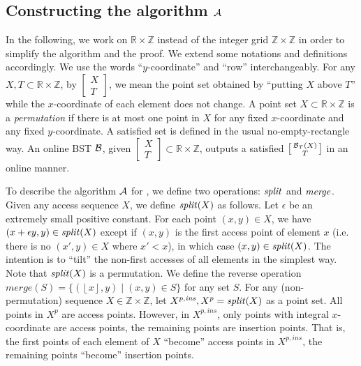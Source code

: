 \subsection{Constructing the algorithm $\cA$}



In the following, we work on $\mathbb{R}\times\mathbb{Z}$ instead
of the integer grid $\mathbb{Z}\times\mathbb{Z}$ in order to simplify
the algorithm and the proof. We extend some notations and definitions
accordingly. We use the words ``$y$-coordinate'' and  ``row'' interchangeably. For any $X,T\subset\mathbb{R}\times\mathbb{Z}$,
by $\left[\begin{smallmatrix}
X\\
T
\end{smallmatrix}\right]$, we mean the point set obtained by ``putting $X$ above $T$''
while the $x$-coordinate of each element does not change. A point
set $X\subset\mathbb{R}\times\mathbb{Z}$ is a \emph{permutation
}if there is at most one point in $X$ for any fixed $x$-coordinate
and any fixed $y$-coordinate. A satisfied set is defined in the
usual no-empty-rectangle way. An online BST $\cB$, given $\left[\begin{smallmatrix}
X\\
T
\end{smallmatrix}\right]\subset\mathbb{R}\times\mathbb{Z}$, outputs a satisfied $\left[\begin{smallmatrix}
\cB_{T}(X)\\
T
\end{smallmatrix}\right]$ in an online manner.

To describe the algorithm $\cA$ for , we define
two operations: $\Split$ and $\merge$. Given any access sequence
$X$, we define $\Split(X)$ as follows. Let $\epsilon$ be an extremely small positive constant.
For each point $(x,y)\in X$, we have $(x+\epsilon y,y)\in\Split(X)$ except
if $(x,y)$ is the first access point of element $x$ (i.e. there
is no $(x',y)\in X$ where $x'<x$), in which case $(x,y)\in\Split(X)$. The
intention is to ``tilt'' the non-first accesses of all elements
in the simplest way. Note that $\Split(X)$ is a permutation.
We define the reverse operation $\mathit{merge}(S)=\{(\left\lfloor x\right\rfloor ,y)\mid(x,y)\in S\}$
for any set $S$. 
%
For any (non-permutation) sequence $X\in \mathbb{Z}\times \mathbb{Z}$, let $X^{p,\mathit{ins}},X^p = \Split(X)$ as a point set.  All points in $X^p$ are access points. However, in $X^{p,\mathit{ins}}$, only points with integral $x$-coordinate are access points, the remaining points are insertion points. That is, the first points of each element of $X$ ``become'' access points in $X^{p,\mathit{ins}}$, the remaining points ``become'' insertion points.

